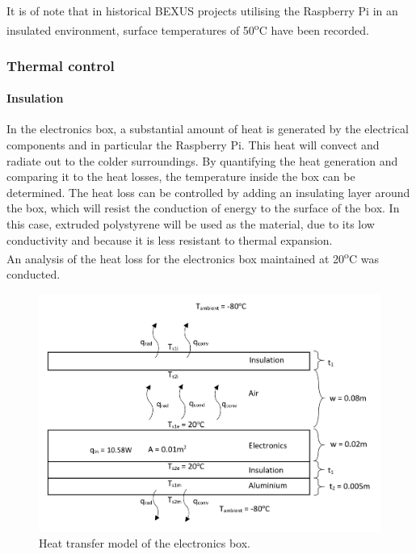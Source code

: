 

It is of note that in historical BEXUS projects utilising the Raspberry Pi in an insulated environment, surface temperatures of 50\textsuperscript{o}C have been recorded. 





















\subsubsection{Thermal control}

\paragraph{Insulation}

In the electronics box, a substantial amount of heat is generated by the electrical components and in particular the Raspberry Pi. This heat will convect and radiate out to the colder surroundings. By quantifying the heat generation and comparing it to the heat losses, the temperature inside the box can be determined. The heat loss can be controlled by adding an insulating layer around the box, which will resist the conduction of energy to the surface of the box. In this case, extruded polystyrene will be used as the material, due to its low conductivity and because it is less resistant to thermal expansion. \\

An analysis of the heat loss for the electronics box maintained at 20\textsuperscript{o}C was conducted. \\

	\begin{figure}[h!]
    \centering
    \includegraphics[scale=0.6]{4-experiment-design/img/mechanical/thermaldiagram.JPG}
	\caption{Heat transfer model of the electronics box.}
	\label{fig:thermaldiagram}
	\end{figure}


